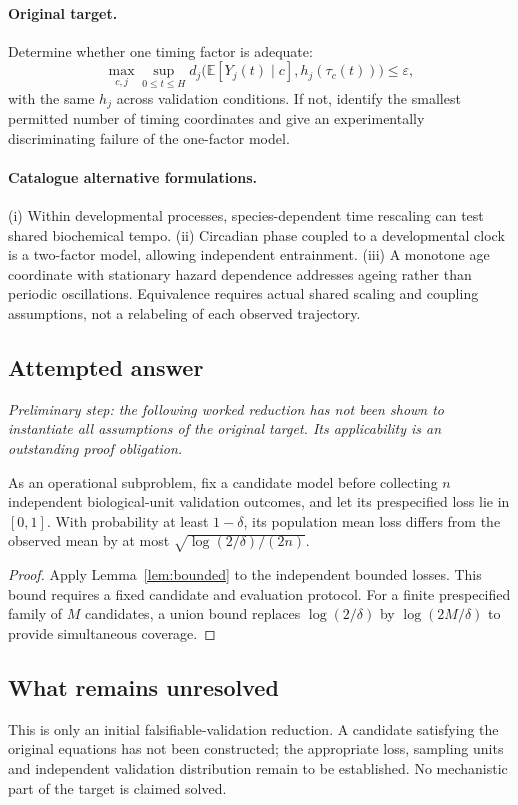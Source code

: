 \documentclass[11pt]{article}
\begin{document}
\paragraph{Original target.}
Determine whether one timing factor is adequate:
    \[\max_{c,j}\sup_{0\leq t\leq H}
      d_j\bigl(\mathbb{E}[Y_j(t)\mid c],h_j(\tau_c(t))\bigr)\leq\varepsilon,\]
    with the same $h_j$ across validation conditions. If not, identify the smallest permitted number of timing coordinates and give an experimentally discriminating failure of the one-factor model.
\paragraph{Catalogue alternative formulations.}
(i) Within developmental processes, species-dependent time rescaling can test shared biochemical tempo. (ii) Circadian phase coupled to a developmental clock is a two-factor model, allowing independent entrainment. (iii) A monotone age coordinate with stationary hazard dependence addresses ageing rather than periodic oscillations. Equivalence requires actual shared scaling and coupling assumptions, not a relabeling of each observed trajectory.
\subsection{Attempted answer}
\noindent\emph{Preliminary step: the following worked reduction has not been shown to instantiate all assumptions of the original target. Its applicability is an outstanding proof obligation.}

\begin{proposition}
As an operational subproblem, fix a candidate model before collecting $n$ independent biological-unit validation outcomes, and let its prespecified loss lie in $[0,1]$. With probability at least $1-\delta$, its population mean loss differs from the observed mean by at most $\sqrt{\log(2/\delta)/(2n)}$.
\end{proposition}
\begin{proof}
Apply Lemma~\ref{lem:bounded} to the independent bounded losses. This bound requires a fixed candidate and evaluation protocol. For a finite prespecified family of $M$ candidates, a union bound replaces $\log(2/\delta)$ by $\log(2M/\delta)$ to provide simultaneous coverage.
\end{proof}
\subsection{What remains unresolved}
This is only an initial falsifiable-validation reduction. A candidate satisfying the original equations has not been constructed; the appropriate loss, sampling units and independent validation distribution remain to be established. No mechanistic part of the target is claimed solved.
\end{document}
